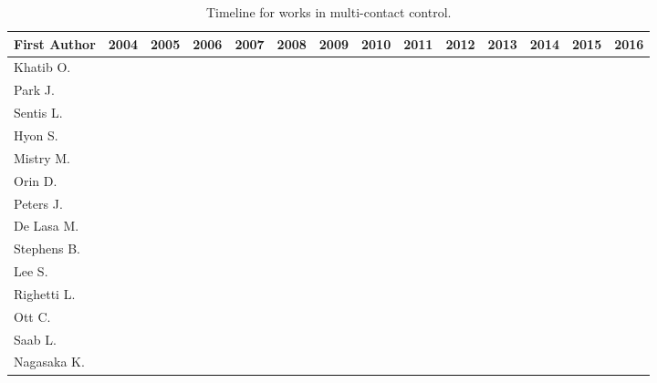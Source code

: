\begin{table*}[t]
	\caption{Timeline for works in multi-contact control.}
	\label{tab:Timeline}
	\scriptsize
	\centering
	\begin{tabular}{|l|c|c|c|c|c|c|c|c|c|c|c|c|c|}
		\hline
		First Author	&
		2004	& 2005	& 2006	& 2007	& 2008	& 2009	& 2010	& 2011	& 2012	& 2013	& 2014	& 2015	& 2016	\\
		\hline
		Khatib O.			&
		\cite{Khatib_IJHR2004}	& & & & & & & & & & & & \\
		Park J.				&
		\cite{Park_ICRA2004}		& \cite{Park_ICRA2005}	& \cite{Park_ICRA2006} \cite{Park_PhDThesis2006}
		&	&	\cite{Park_Robotica2008}	& & & & & & & & \\
		Sentis L.			&
		\cite{Sentis_IJHR2004} & \cite{Sentis_ICRA2005} \cite{Sentis_IJHR2005}	& \cite{Sentis_ICRA2006}
		& \cite{Sentis_PhDThesis2007}	& & \cite{Sentis_IROS2009}
		& \cite{Sentis_MotionPlan2010} \cite{Sentis_TransRobotics2010}	&	& & & & & \\
		Hyon S.				&
		& & \cite{Hyon_Humanoids2006} \cite{Hyon_IROS2006}	& \cite{Hyon_ICRA2007} \cite{Hyon_TransRobotics2007}
		& & \cite{Hyon_ICRA2009} \cite{Hyon_TransRobotics2009}	& & & & & & & \\
		Mistry M.			&
		& & & \cite{Mistry_IROS2007} & & & \cite{Mistry_ICRA2010}	& \cite{Mistry_RSS2011}	& & & & & \\
		Orin D.				&
		& & & & \cite{Orin_IROS2008} & & & & & \cite{Orin_AutoRobots2013} & & & \\
		Peters J.			&
		& & & & \cite{Peters_AutoRobots2008} & & & & & & & & \\
		De Lasa M.		&
		& & & & & \cite{DeLasa_IROS2009}	& & & & & & & \\
		Stephens B.		&
		& & & & & & \cite{Stephens_IROS2010}	& & & & & & \\
		Lee S.				&
		& & & & & & \cite{LeeS_IROS2010}	& & \cite{LeeS_AutoRobots2012}	& & & & \\
		Righetti L.		&
		& & & & & & \cite{Righetti_CLAWAR2010} & \cite{Righetti_ICRA2011} \cite{Righetti_Humanoids2011}
		& \cite{Righetti_Humanoids2012}	& \cite{Righetti_IJRR2013}	& & & \\
		Ott C.				&
		& & & & & & & \cite{Ott_Humanoids2011}	& & & & & \\
		Saab L.				&
		& & & & & & & \cite{Saab_ICRA2011} \cite{Saab_IROS2011}	& & \cite{Saab_TransRobotics2013}	& & & \\
		Nagasaka K.		&
		& & & & & & & & \cite{Nagasaka_RobotSymp2012}	& & & & \\

\end{tabular}
\end{table*}
